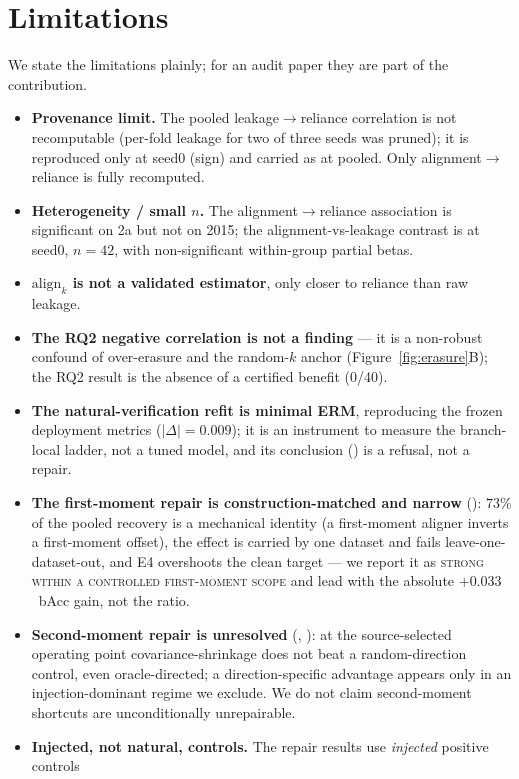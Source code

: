 \section{Limitations}
\label{sec:limitations}

We state the limitations plainly; for an audit paper they are part of the contribution.
\begin{itemize}
\item \textbf{Provenance limit.} The pooled leakage$\to$reliance correlation is not recomputable
(per-fold leakage for two of three seeds was pruned); it is reproduced only at seed0 (sign) and carried
as  at pooled. Only alignment$\to$reliance is fully recomputed.
\item \textbf{Heterogeneity / small $n$.} The alignment$\to$reliance association is significant on 2a
but not on 2015; the alignment-vs-leakage contrast is at seed0, $n{=}42$, with non-significant
within-group partial betas.
\item \textbf{$\mathrm{align}_k$ is not a validated estimator}, only closer to reliance than raw
leakage.
\item \textbf{The RQ2 negative correlation is not a finding} --- it is a non-robust confound of
over-erasure and the random-$k$ anchor (Figure~\ref{fig:erasure}B); the RQ2 result is the absence of a
certified benefit (0/40).
\item \textbf{The natural-verification refit is minimal ERM}, reproducing the frozen deployment metrics
($|\Delta|{=}0.009$); it is an instrument to measure the branch-local ladder, not a tuned model, and its
conclusion () is a refusal, not a repair.
\item \textbf{The first-moment repair is construction-matched and narrow} (): $73\%$ of the
pooled recovery is a mechanical identity (a first-moment aligner inverts a first-moment offset), the
effect is carried by one dataset and fails leave-one-dataset-out, and E4 overshoots the clean target ---
we report it as \textsc{strong within a controlled first-moment scope} and lead with the absolute
$+0.033$~bAcc gain, not the ratio.
\item \textbf{Second-moment repair is unresolved} (, ): at the source-selected
operating point covariance-shrinkage does not beat a random-direction control, even oracle-directed; a
direction-specific advantage appears only in an injection-dominant regime we exclude. We do not claim
second-moment shortcuts are unconditionally unrepairable.
\item \textbf{Injected, not natural, controls.} The repair results use \emph{injected} positive controls

\end{itemize}
